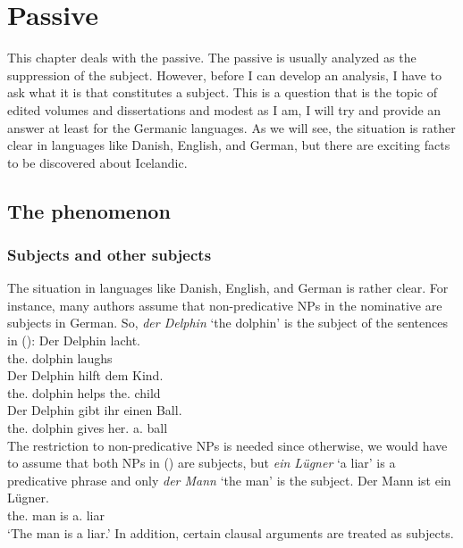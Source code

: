 \chapter{Passive}
\label{chap-case}


This chapter deals with the passive. The passive is usually analyzed as the suppression of the
subject. However, before I can develop an analysis, I have to ask what it is that constitutes a
subject. This is a question that is the topic of edited volumes and dissertations and modest as I
am, I will try and provide an answer at least for the Germanic languages. As we will see, the
situation is rather clear in languages like Danish, English, and German, but there are exciting
facts to be discovered about Icelandic. 


\section{The phenomenon}


\subsection{Subjects and other subjects}
\label{sec-subj-properties}
\label{sec-icelandic-quirky-subj}

The situation in languages like Danish, English, and German is rather clear. For instance, many
authors assume that non-predicative NPs in the nominative are subjects in German. So, \emph{der
  Delphin} `the dolphin' is the subject of the sentences in (): 
\eal
\ex 
\gll Der Delphin lacht.\\
     the.\NOM{} dolphin laughs\\\german
\ex 
\gll Der Delphin hilft dem Kind.\\
     the.\NOM{} dolphin helps the.\DAT{} child\\
\ex 
\gll Der Delphin gibt  ihr einen Ball.\\
     the.\NOM{} dolphin gives her.\DAT{} a.\ACC{} ball\\
\zl
The restriction to non-predicative NPs is needed since otherwise, we would have to assume that both
NPs in () are subjects, but \emph{ein Lügner} `a liar' is a predicative phrase and only
\emph{der Mann} `the man' is the subject.
\ea
\gll Der Mann ist ein Lügner.\\
     the.\NOM{} man is a.\NOM{} liar\\\german
\glt `The man is a liar.'
\z
In addition, certain clausal arguments are treated as subjects.

